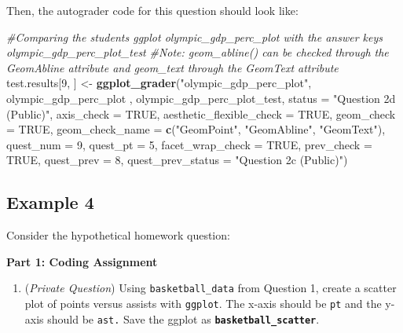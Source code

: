 \documentclass[
  12pt,
]{book}
\newenvironment{Shaded}{\begin{snugshade}}{\end{snugshade}}
\newcommand{\AttributeTok}[1]{\textcolor[rgb]{0.13,0.29,0.53}{#1}}
\newcommand{\CommentTok}[1]{\textcolor[rgb]{0.56,0.35,0.01}{\textit{#1}}}
\newcommand{\ConstantTok}[1]{\textcolor[rgb]{0.56,0.35,0.01}{#1}}
\newcommand{\DecValTok}[1]{\textcolor[rgb]{0.00,0.00,0.81}{#1}}
\newcommand{\FunctionTok}[1]{\textcolor[rgb]{0.13,0.29,0.53}{\textbf{#1}}}
\newcommand{\NormalTok}[1]{#1}
\newcommand{\OtherTok}[1]{\textcolor[rgb]{0.56,0.35,0.01}{#1}}
\newcommand{\StringTok}[1]{\textcolor[rgb]{0.31,0.60,0.02}{#1}}
\providecommand{\tightlist}{%
  \setlength{\itemsep}{0pt}\setlength{\parskip}{0pt}}
\begin{document}
Then, the autograder code for this question should look like:

\begin{Shaded}
\begin{Highlighting}[]
\CommentTok{\#Comparing the student\textquotesingle{}s ggplot \textasciigrave{}olympic\_gdp\_perc\_plot\textasciigrave{} with the answer key\textquotesingle{}s \textasciigrave{}olympic\_gdp\_perc\_plot\_test\textasciigrave{} }
\CommentTok{\#Note: \textasciigrave{}geom\_abline()\textasciigrave{} can be checked through the \textasciigrave{}GeomAbline\textasciigrave{} attribute and \textasciigrave{}geom\_text\textasciigrave{} through the \textasciigrave{}GeomText\textasciigrave{} attribute}
\NormalTok{test.results[}\DecValTok{9}\NormalTok{, ] }\OtherTok{\textless{}{-}} \FunctionTok{ggplot\_grader}\NormalTok{(}\StringTok{"olympic\_gdp\_perc\_plot"}\NormalTok{, olympic\_gdp\_perc\_plot , }
\NormalTok{                                   olympic\_gdp\_perc\_plot\_test, }\AttributeTok{status =} \StringTok{"Question 2d (Public)"}\NormalTok{,}
                                   \AttributeTok{axis\_check =} \ConstantTok{TRUE}\NormalTok{, }\AttributeTok{aesthetic\_flexible\_check =} \ConstantTok{TRUE}\NormalTok{, }
                                   \AttributeTok{geom\_check =} \ConstantTok{TRUE}\NormalTok{, }\AttributeTok{geom\_check\_name =} \FunctionTok{c}\NormalTok{(}\StringTok{"GeomPoint"}\NormalTok{, }\StringTok{"GeomAbline"}\NormalTok{, }\StringTok{"GeomText"}\NormalTok{),  }
                                   \AttributeTok{quest\_num =} \DecValTok{9}\NormalTok{, }\AttributeTok{quest\_pt =} \DecValTok{5}\NormalTok{, }\AttributeTok{facet\_wrap\_check =} \ConstantTok{TRUE}\NormalTok{,}
                                   \AttributeTok{prev\_check =} \ConstantTok{TRUE}\NormalTok{, }\AttributeTok{quest\_prev =} \DecValTok{8}\NormalTok{, }\AttributeTok{quest\_prev\_status =} \StringTok{"Question 2c (Public)"}\NormalTok{)}
\end{Highlighting}
\end{Shaded}

\subsection*{Example 4}\label{example-4}

Consider the hypothetical homework question:

\textbf{Part 1: Coding Assignment}

\begin{enumerate}
\def\labelenumi{\arabic{enumi}.}
\setcounter{enumi}{1}
\tightlist
\item
  (\emph{Private Question}) Using \texttt{basketball\_data} from Question 1, create a scatter plot of points versus assists with \texttt{ggplot}. The x-axis should be \texttt{pt} and the y-axis should be \texttt{ast.} Save the ggplot as \textbf{\texttt{basketball\_scatter}}.
\end{enumerate}
\end{document}
